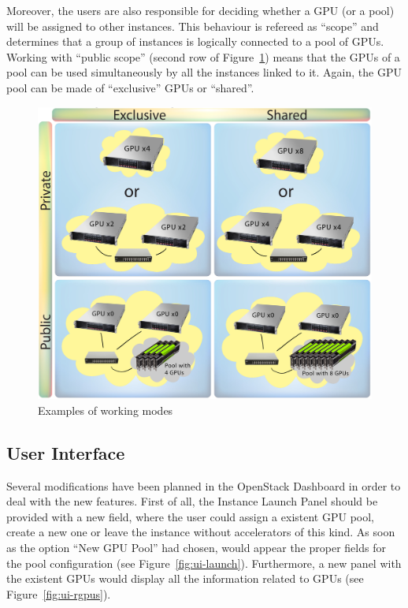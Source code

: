\documentclass[a4paper,twoside]{article}
\begin{document}
Moreover, the users are also responsible for deciding whether a GPU (or a pool) will be assigned to other instances. 
This behaviour is refereed as ``scope'' and determines that a group of instances is logically connected to a pool of GPUs.
Working with ``public scope'' (second row of Figure~\ref{fig2}) means that the GPUs of a pool can be used simultaneously by all the instances linked to it.
Again, the GPU pool can be made of ``exclusive'' GPUs or ``shared''.

\begin{figure}[htb]
  \centering
  \includegraphics[width=.5\textwidth]{images/workingmodes.jpg}
  \caption{Examples of working modes}
  \label{fig2}
\end{figure}

\subsection{User Interface}
Several modifications have been planned in the OpenStack Dashboard in order to deal with the new features.
First of all, the Instance Launch Panel should be provided with a new field, where the user could assign a existent GPU pool, create a new one or leave the instance without accelerators of this kind.
As soon as the option ``New GPU Pool'' had chosen, would appear the proper fields for the pool configuration (see Figure~\ref{fig:ui-launch}).
Furthermore, a new panel with the existent GPUs would display all the information related to GPUs (see Figure~\ref{fig:ui-rgpus}).
\end{document}
